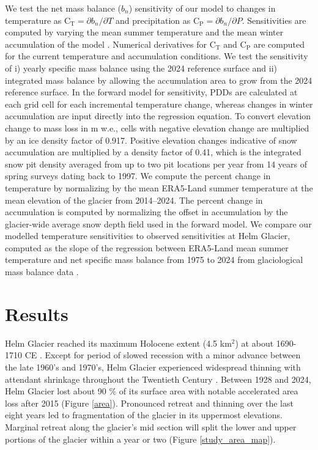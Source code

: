 \documentclass[annals,review,oneside]{igs}
\begin{document}
We test the net mass balance ($b_n$) sensitivity of our model to changes in temperature as $\mathrm{C_T} = \partial b_n/ \partial T$ and precipitation as $\mathrm{C_P} = \partial b_n/ \partial P$. Sensitivities are computed by varying the mean summer temperature and the mean winter accumulation of the model \citep[e.g.][]{Cuffey2010}. Numerical derivatives for $\mathrm{C_T}$ and $\mathrm{C_P}$ are computed for the current temperature and accumulation conditions. We test the sensitivity of i) yearly specific mass balance using the 2024 reference surface \citep[e.g.][]{Elsberg2001} and ii) integrated mass balance by allowing the accumulation area to grow from the 2024 reference surface. In the forward model for sensitivity, PDDs are calculated at each grid cell for each incremental temperature change, whereas changes in winter accumulation are input directly into the regression equation. To convert elevation change to mass loss in m w.e., cells with negative elevation change are multiplied by an ice density factor of 0.917. Positive elevation changes indicative of snow accumulation are multiplied by a density factor of 0.41, which is the integrated snow pit density averaged from up to two pit locations per year from 14 years of spring surveys dating back to 1997. We compute the percent change in temperature by normalizing by the mean ERA5-Land summer temperature at the mean elevation of the glacier from 2014--2024. The percent change in accumulation is computed by normalizing the offset in accumulation by the glacier-wide average snow depth field used in the forward model. We compare our modelled temperature sensitivities to observed sensitivities at Helm Glacier, computed as the slope of the regression between ERA5-Land mean summer temperature and net specific mass balance from 1975 to 2024 from glaciological mass balance data \citep{WGMS2024}.
\section{Results}

Helm Glacier reached its maximum Holocene extent (4.5 km$^{2}$) at about 1690-1710 CE \citep{Koch2009}. Except for period of slowed recession with a minor advance between the late 1960’s and 1970’s, Helm Glacier experienced widespread thinning with attendant shrinkage throughout the Twentieth Century \citep{Koch2009}. Between 1928 and 2024, Helm Glacier lost about 90 \% of its surface area with notable accelerated area loss after 2015 (Figure \ref{area}). Pronounced retreat and thinning over the last eight years led to fragmentation of the glacier in its uppermost elevations.  Marginal retreat along the glacier's mid section will split the lower and upper portions of the glacier within a year or two (Figure \ref{study_area_map}). 
\end{document}
